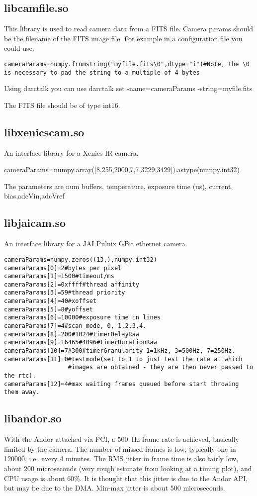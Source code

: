 \documentclass[a4,10pt]{article}
\begin{document}
\subsection{libcamfile.so}
This library is used to read camera data from a FITS file.
Camera params should be the filename of the FITS image file.
For example in a configuration file you could use:
\begin{verbatim}
cameraParams=numpy.fromstring("myfile.fits\0",dtype="i")#Note, the \0 is necessary to pad the string to a multiple of 4 bytes
\end{verbatim}
Using darctalk you can use darctalk set -name=cameraParams -string=myfile.fits

The FITS file should be of type int16.

\subsection{libxenicscam.so}
An interface library for a Xenics IR camera.

cameraParams=numpy.array([8,255,2000,7,7,3229,3429]).astype(numpy.int32)

The parameters are num buffers, temperature, exposure time (us), current, bias,adcVin,adcVref

\subsection{libjaicam.so}
An interface library for a JAI Pulnix GBit ethernet camera.
\begin{verbatim}
cameraParams=numpy.zeros((13,),numpy.int32)
cameraParams[0]=2#bytes per pixel
cameraParams[1]=1500#timeout/ms
cameraParams[2]=0xffff#thread affinity
cameraParams[3]=59#thread priority
cameraParams[4]=40#xoffset
cameraParams[5]=8#yoffset
cameraParams[6]=10000#exposure time in lines
cameraParams[7]=4#scan mode, 0, 1,2,3,4.
cameraParams[8]=200#1024#timerDelayRaw
cameraParams[9]=16465#4096#timerDurationRaw
cameraParams[10]=7#300#timerGranularity 1=1kHz, 3=500Hz, 7=250Hz.
cameraParams[11]=0#testmode(set to 1 to just test the rate at which
                  #images are obtained - they are then never passed to the rtc).
cameraParams[12]=4#max waiting frames queued before start throwing them away.
\end{verbatim}

\subsection{libandor.so}
With the Andor attached via PCI, a 500~Hz frame rate is achieved,
basically limited by the camera.  The number of missed frames is low,
typically one in 120000, i.e.\ every 4 minutes.  The RMS jitter in
frame time is also fairly low, about 200 microseconds (very rough
estimate from looking at a timing plot), and CPU usage is about
$60\%$.  It is thought that this jitter is due to the Andor API, but
may be due to the DMA.  Min-max jitter is about 500 microseconds.  
\end{document}
